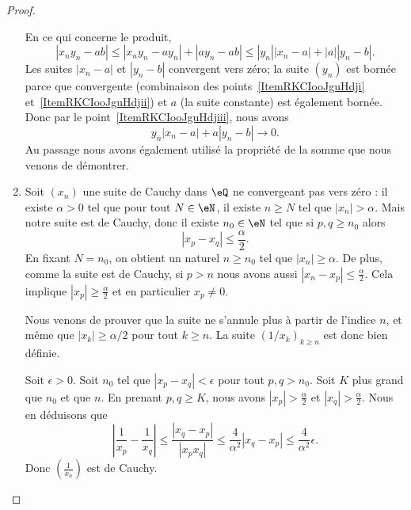 \begin{proof}
\begin{enumerate}
            En ce qui concerne le produit,
            \begin{equation}
                | x_ny_n-ab |\leq | x_ny_n-ay_n |+| ay_n-ab |\leq | y_n || x_n-a |+| a || y_n-b |.
            \end{equation}
            Les suites \( | x_n-a |\) et \( | y_n-b |\) convergent vers zéro; la suite \( (y_n)\) est bornée parce que convergente (combinaison des points~\ref{ItemRKCIooJguHdji} et~\ref{ItemRKCIooJguHdjii})  et \( a\) (la suite constante) est également bornée. Donc par le point~\ref{ItemRKCIooJguHdjiii}, nous avons
            \begin{equation}
                y_n| x_n-a |+a| y_n-b |\to 0.
            \end{equation}
            Au passage nous avons également utilisé la propriété de la somme que nous venons de démontrer.
        \item Soit \( (x_n)\) une suite de Cauchy dans \( \eQ\) ne convergeant pas vers zéro : il existe \( \alpha>0\) tel que pour tout \( N\in \eN\), il existe \( n\geq N\) tel que \( | x_n |>\alpha\). Mais notre suite est de Cauchy, donc il existe \( n_0\in \eN\) tel que si \( p,q\geq n_0\) alors
            \begin{equation}
                | x_p-x_q |\leq \frac{ \alpha }{2}.
            \end{equation}
            En fixant \( N = n_0\), on obtient un naturel \( n\geq n_0\) tel que \( | x_n |\geq \alpha\). De plus, comme la suite est de Cauchy, si \( p>n\) nous avons aussi \( | x_n-x_p |\leq \frac{ \alpha }{2}\). Cela implique \( | x_p |\geq \frac{ \alpha }{2}\) et en particulier \( x_p\neq 0\).

            Nous venons de prouver que la suite ne s'annule plus à partir de l'indice \( n\), et même que \( | x_k |\geq\alpha/2\) pour tout \( k\geq n\). La suite \( (1/x_k)_{k\geq n}\) est donc bien définie.

            Soit \( \epsilon>0\). Soit \( n_0\) tel que \( | x_p-x_q |<\epsilon\) pour tout \( p,q>n_0\). Soit \( K\) plus grand que \( n_0\) et que \( n\). En prenant \( p,q\geq K\), nous avons \( |  x_p|>\frac{ \alpha }{2}\) et \( | x_q |>\frac{ \alpha }{2}\). Nous en déduisons que
            \begin{equation}
                \left| \frac{1}{ x_p }-\frac{1}{ x_q } \right| \leq \frac{ | x_q-x_p | }{ | x_px_q | }\leq \frac{ 4 }{ \alpha^2 }| x_q-x_p |\leq \frac{ 4 }{ \alpha^2 }\epsilon.
            \end{equation}
            Donc \( \left( \frac{1}{ x_n } \right)\) est de Cauchy.
    \end{enumerate}
\end{proof}



